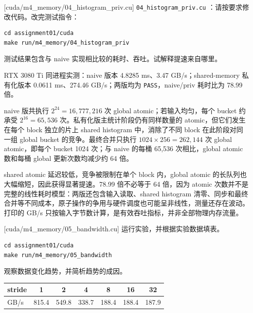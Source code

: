 \documentclass[11pt,a4paper,fontset=none]{ctexart}
\begin{document}
[cuda/m4\_memory/04\_histogram\_priv.cu]
\texttt{04\_histogram\_priv.cu} ：请按要求修改代码。改完测试指令：

\begin{lstlisting}
cd assignment01/cuda
make run/m4_memory/04_histogram_priv
\end{lstlisting}

测试结果包含与 naive 实现相比较的耗时、吞吐。试解释提速来自哪里。

\begin{tcolorbox}[title={4.6 实验记录与分析}]
RTX 3080 Ti 同进程实测：naive 版本 4.8285 ms、3.47 GB/s；shared-memory 私有化版本 0.0611 ms、274.46 GB/s；两版均为 \texttt{PASS}，naive/priv 耗时比为 78.99 倍。

naive 版共执行 $2^{24}=16{,}777{,}216$ 次 global atomic；若输入均匀，每个 bucket 约承受 $2^{16}=65{,}536$ 次。私有化版主统计阶段仍有同样数量的 atomic，但它们发生在每个 block 独立的片上 shared histogram 中，消除了不同 block 在此阶段对同一组 global bucket 的竞争。最终合并只执行 $1024\times256=262{,}144$ 次 global atomic，即每个 bucket 1024 次；与 naive 的每桶 65,536 次相比，global atomic 数和每桶 global 更新次数均减少约 64 倍。

shared atomic 延迟较低，竞争被限制在单个 block 内，global atomic 的长队列也大幅缩短，因此获得显著提速。78.99 倍不必等于 64 倍，因为 atomic 次数并不是完整的线性耗时模型：两版还包含输入读取、shared histogram 清零、同步和最终合并等不同成本，原子操作的争用与硬件调度也可能呈非线性，测量还存在波动。打印的 GB/s 只按输入字节数计算，是有效吞吐指标，并非全部物理内存流量。
\end{tcolorbox}

[cuda/m4\_memory/05\_bandwidth.cu]
运行实验，并根据实验数据填表。

\begin{lstlisting}
cd assignment01/cuda
make run/m4_memory/05_bandwidth
\end{lstlisting}

观察数据变化趋势，并简析趋势的成因。

\begin{center}\small
\begin{tabular}{@{}lcccccc@{}}
\toprule
stride & 1 & 2 & 4 & 8 & 16 & 32 \\
\midrule
GB/s & 815.4 & 549.8 & 338.7 & 188.4 & 188.4 & 187.9 \\
\bottomrule
\end{tabular}
\end{center}
\end{document}
